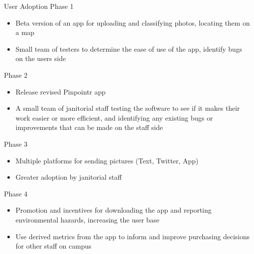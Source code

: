 \documentclass[22pt]{beamer}
\begin{document}
\begin{frame}[fragile]
\begin{textblock}{7.25}
\begin{block}{User Adoption}
Phase 1
\begin{itemize}
\item Beta version of an app for uploading and classifying photos, locating them on a map
\item Small team of testers to determine the ease of use of the app, identify bugs on the users side
\end{itemize}
Phase 2
\begin{itemize}
\item Release revised Pinpointr app 
\item A small team of janitorial staff testing the software to see if it makes their work easier or more efficient, and identifying any existing bugs or improvements that can be made on the staff side
\end{itemize}
Phase 3
\begin{itemize}
\item Multiple platforms for sending pictures (Text, Twitter, App)
\item Greater adoption by janitorial staff
\end{itemize}
Phase 4
\begin{itemize}
\item Promotion and incentives for downloading the app and reporting environmental hazards, increasing the user base
\item Use derived metrics from the app to inform and improve purchasing decisions for other staff on campus
\end{itemize}
\end{block}
\end{textblock}




\end{frame}
\end{document}
